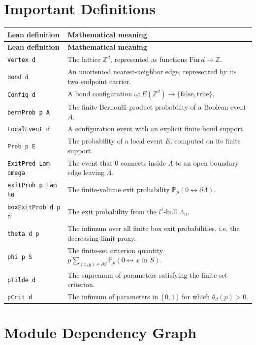 \documentclass[10pt]{article}
\newcommand{\module}[1]{\texttt{#1}}
\newcommand{\prob}{\mathbb P}
\begin{document}
\section*{Important Definitions}

\begin{longtable}{>{\raggedright\arraybackslash}p{} >{\raggedright\arraybackslash}p{}}
\textbf{Lean definition} & \textbf{Mathematical meaning} \\
\hline
\endfirsthead
\textbf{Lean definition} & \textbf{Mathematical meaning} \\
\hline
\endhead
\module{Vertex d} & The lattice \(\mathbb Z^d\), represented as functions \(\mathrm{Fin}\ d\to\mathbb Z\). \\
\module{Bond d} & An unoriented nearest-neighbor edge, represented by its two endpoint carrier. \\
\module{Config d} & A bond configuration \(\omega:E(\mathbb Z^d)\to\{\mathrm{false},\mathrm{true}\}\). \\
\module{bernProb p A} & The finite Bernoulli product probability of a Boolean event \(A\). \\
\module{LocalEvent d} & A configuration event with an explicit finite bond support. \\
\module{Prob p E} & The probability of a local event \(E\), computed on its finite support. \\
\module{ExitPred Lam omega} & The event that \(0\) connects inside \(\Lambda\) to an open boundary edge leaving \(\Lambda\). \\
\module{exitProb p Lam h0} & The finite-volume exit probability \(\prob_p(0\leftrightarrow\partial\Lambda)\). \\
\module{boxExitProb d p n} & The exit probability from the \(l^1\)-ball \(\Lambda_n\). \\
\module{theta d p} & The infimum over all finite box exit probabilities, i.e. the decreasing-limit proxy. \\
\module{phi p S} & The finite-set criterion quantity \(p\sum_{(x,y)\in\partial S}\prob_p(0\leftrightarrow x\text{ in }S)\). \\
\module{pTilde d} & The supremum of parameters satisfying the finite-set criterion. \\
\module{pCrit d} & The infimum of parameters in \([0,1]\) for which \(\theta_d(p)>0\). \\
\end{longtable}

\section*{Module Dependency Graph}
\end{document}
